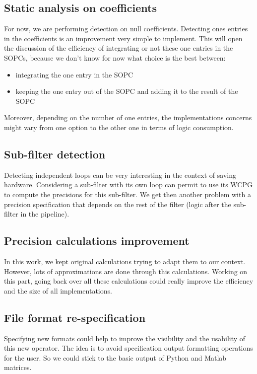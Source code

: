 \subsection{Static analysis on coefficients}
	For now, we are performing detection on null coefficients.
	Detecting ones entries in the coefficients is an improvement very simple to implement.
	This will open the discussion of the efficiency of integrating or not these one entries in the SOPCs, because we don't know for now what choice is the best between:
	\begin{itemize}
		\item integrating the one entry in the SOPC
		\item keeping the one entry out of the SOPC and adding it to the result of the SOPC
	\end{itemize}

	Moreover, depending on the number of one entries, the implementations concerns might vary from one option to the other one in terms of logic consumption.


\subsection{Sub-filter detection}
	Detecting independent loops can be very interesting in the context of saving hardware.
	Considering a sub-filter with its own loop can permit to use its WCPG to compute the precisions for this sub-filter.
	We get then another problem with a precision specification that depends on the rest of the filter (logic after the sub-filter in the pipeline).

\subsection{Precision calculations improvement}
	In this work, we kept original calculations trying to adapt them to our context.
	However, lots of approximations are done through this calculations.
	Working on this part, going back over all these calculations could really improve the efficiency and the size of all implementations.


\subsection{File format re-specification}
	Specifying new formats could help to improve the visibility and the usability of this new operator.
	The idea is to avoid specification output formatting operations for the user.
	So we could stick to the basic output of Python and Matlab matrices.

